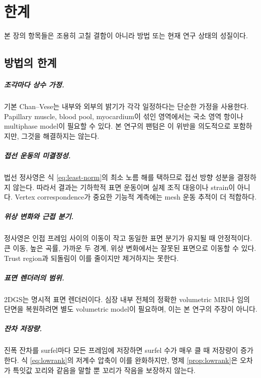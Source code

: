\chapter{한계}
\label{ch:limitations}

본 장의 항목들은 조용히 고칠 결함이 아니라 방법 또는 현재 연구 상태의 성질이다.

\section{방법의 한계}

\paragraph{조각마다 상수 가정.}
기본 Chan--Vese는 내부와 외부의 밝기가 각각 일정하다는 단순한 가정을 사용한다.
Papillary muscle, blood pool, myocardium이 섞인 영역에서는 국소 영역 항이나 multiphase
model이 필요할 수 있다. 본 연구의 팬텀은 이 위반을 의도적으로 포함하지만, 그것을
해결하지는 않는다.

\paragraph{접선 운동의 미결정성.}
법선 정사영은 식 \eqref{eq:least-norm}의 최소 노름 해를 택하므로 접선 방향 성분을
결정하지 않는다. 따라서 결과는 기하학적 표면 운동이며 실제 조직 대응이나 strain이
아니다. Vertex correspondence가 중요한 기능적 계측에는 mesh 운동 추적이 더 적합하다.

\paragraph{위상 변화와 근접 분기.}
정사영은 인접 프레임 사이의 이동이 작고 동일한 표면 분기가 유지될 때 안정적이다.
큰 이동, 높은 곡률, 가까운 두 경계, 위상 변화에서는 잘못된 표면으로 이동할 수 있다.
Trust region과 되돌림이 이를 줄이지만 제거하지는 못한다.

\paragraph{표면 렌더러의 범위.}
2DGS는 명시적 표면 렌더러이다. 심장 내부 전체의 정확한 volumetric MRI나 임의 단면을
복원하려면 별도 volumetric model이 필요하며, 이는 본 연구의 주장이 아니다.

\paragraph{잔차 저장량.}
진폭 잔차를 surfel마다 모든 프레임에 저장하면 surfel 수가 매우 클 때 저장량이
증가한다. 식 \eqref{eq:lowrank}의 저계수 압축이 이를 완화하지만, 명제
\ref{prop:lowrank}은 오차가 특잇값 꼬리와 같음을 말할 뿐 꼬리가 작음을 보장하지 않는다.

